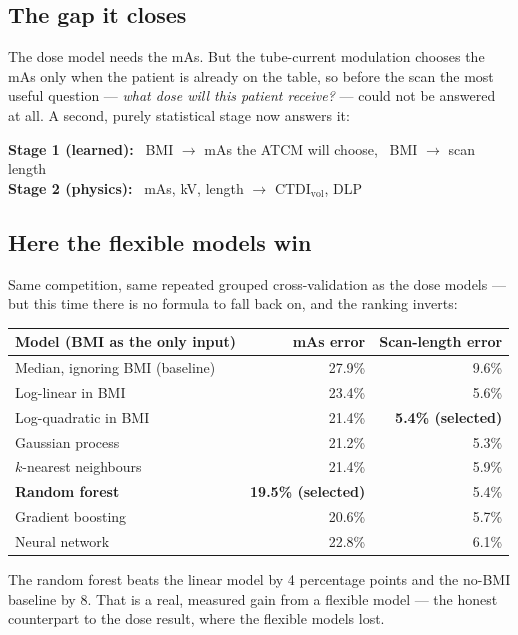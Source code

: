 \documentclass[10pt,a4paper]{article}
\newcommand{\ctdi}{\ensuremath{\mathrm{CTDI}_{\mathrm{vol}}}}
\newcommand{\hdr}{\rowcolor{ctsurf}}
\begin{document}
\subsection{The gap it closes}
The dose model needs the mAs. But the tube-current modulation chooses the mAs only when the patient is already on
the table, so before the scan the most useful question --- \textit{what dose will this patient receive?} --- could
not be answered at all. A second, purely statistical stage now answers it:
\begin{eqbox}
\textbf{Stage 1 (learned):} \ BMI $\rightarrow$ mAs the ATCM will choose, \ BMI $\rightarrow$ scan length\\[3pt]
\textbf{Stage 2 (physics):} \ mAs, kV, length $\rightarrow$ \ctdi, DLP
\end{eqbox}

\subsection{Here the flexible models win}
Same competition, same repeated grouped cross-validation as the dose models --- but this time there is no formula
to fall back on, and the ranking inverts:

\begin{table}[h]\footnotesize
\begin{tabularx}{\linewidth}{@{}L r r@{}}
\toprule
\hdr \textbf{Model (BMI as the only input)} & \textbf{mAs error} & \textbf{Scan-length error}\\
\midrule
Median, ignoring BMI (baseline) & 27.9\% & 9.6\%\\
Log-linear in BMI & 23.4\% & 5.6\%\\
Log-quadratic in BMI & 21.4\% & \textbf{5.4\% (selected)}\\
Gaussian process & 21.2\% & 5.3\%\\
$k$-nearest neighbours & 21.4\% & 5.9\%\\
\textbf{Random forest} & \textbf{19.5\% (selected)} & 5.4\%\\
Gradient boosting & 20.6\% & 5.7\%\\
Neural network & 22.8\% & 6.1\%\\
\bottomrule
\end{tabularx}
\end{table}

The random forest beats the linear model by 4 percentage points and the no-BMI baseline by 8. That is a real,
measured gain from a flexible model --- the honest counterpart to the dose result, where the flexible models lost.
\end{document}
